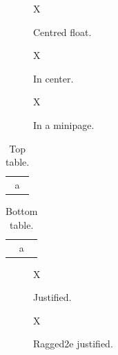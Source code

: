 \documentclass{article}
\begin{document}
\begin{figure}\centering X\caption{Centred float.}\end{figure}
\begin{figure}\begin{center}X\caption*{In center.}\end{center}\end{figure}
\begin{figure}\begin{minipage}{.4\textwidth}\centering X\caption{In a minipage.}\end{minipage}\end{figure}
\begin{table}\caption{Top table.}\centering\begin{tabular}{c}a\end{tabular}\end{table}
\begin{table}\centering\begin{tabular}{c}a\end{tabular}\caption{Bottom table.}\end{table}
\begin{figure}\captionsetup{justification=justified}\centering X\caption{Justified.}\end{figure}
\begin{figure}\captionsetup{justification=Justified}\centering X\caption{Ragged2e justified.}\end{figure}
\end{document}
